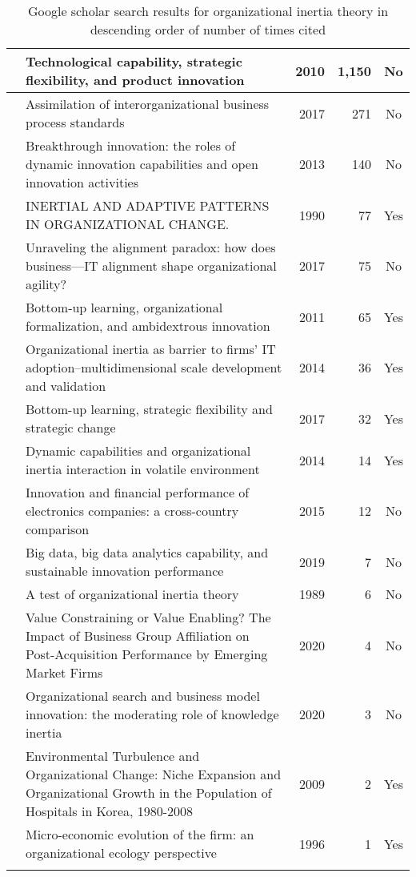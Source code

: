 \begin{longtable}{
		|>{\raggedright\arraybackslash}p{3.7cm}
		|>{\raggedright\arraybackslash}p{3.7cm}
		|r
		|r
		|c
		|}
	\cite{zhou2010technological} & Technological capability, strategic flexibility, and product innovation & 2010 & 1,150 & No \\
	\hline 
	\cite{bala2007assimilation} & Assimilation of interorganizational business process standards & 2017 & 271 & No \\
	\hline
	\cite{cheng2013breakthrough} & Breakthrough innovation: the roles of dynamic innovation capabilities and open innovation activities & 2013 & 140 & No \\
	\hline
	\cite{baum1990inertial} & INERTIAL AND ADAPTIVE PATTERNS IN ORGANIZATIONAL CHANGE. & 1990 & 77 & Yes \\
	\hline
	\cite{liang2017unraveling} & Unraveling the alignment paradox: how does business—IT alignment shape organizational agility? & 2017 & 75 & No \\
	\hline 
	\cite{wei2011bottom} & Bottom‐up learning, organizational formalization, and ambidextrous innovation & 2011 & 65 & Yes \\
	\hline 
	\cite{haag2014organizational} & Organizational inertia as barrier to firms' IT 	adoption–multidimensional scale development and validation & 2014 & 36 & Yes \\
	\hline 
	\cite{yi2017bottom} & Bottom-up learning, strategic flexibility and strategic change & 2017 & 32 & Yes \\
	\hline
	\cite{nedzinskas2014dynamic} & Dynamic capabilities and organizational inertia interaction in volatile environment & 2014 & 14 & Yes \\
	\hline 
	\cite{cortez2015innovation} & Innovation and financial performance of electronics companies: a cross-country comparison & 2015 & 12 & No \\
	\hline 	
	\cite{hao2019big} & Big data, big data analytics capability, and sustainable innovation performance & 2019 & 7 & No \\
	\hline
	\cite{kelly1989test} & A test of organizational inertia theory & 1989 & 6 & No \\
	\hline
	\cite{popli2020value} & Value Constraining or Value Enabling? The Impact of Business Group Affiliation on Post-Acquisition Performance by Emerging Market Firms & 2020 & 4 & No \\
	\hline
	\cite{yu2020organizational} & Organizational search and business model innovation: the moderating role of knowledge inertia & 2020 & 3 & No \\
	\hline
	\cite{jung2009environmental} & Environmental Turbulence and Organizational Change: Niche Expansion and Organizational Growth in the Population of Hospitals in Korea, 1980-2008 & 2009 & 2 & Yes \\ 
	\hline
	\cite{ng1996micro} & Micro-economic evolution of the firm: an organizational ecology perspective & 1996 & 1 & Yes \\
	\hline 

	\caption{Google scholar search results for organizational inertia theory in descending order of number of times cited} 
\end{longtable} 
